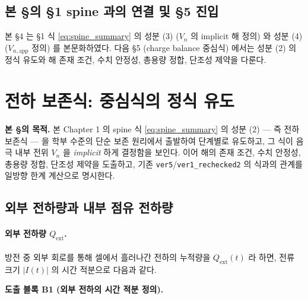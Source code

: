 \documentclass[11pt,a4paper]{article}
\newcommand{\app}{\mathrm{app}}
\newcommand{\ext}{\mathrm{ext}}
\begin{document}
\subsection{본 \S 의 \S 1 spine 과의 연결 및 \S 5 진입}
\label{sec:section_4_to_5_bridge}

본 \S 4 는 \S 1 식 \eqref{eq:spine_summary} 의 성분 (3) ($V_n$ 의 implicit 해 정의)
와 성분 (4) ($V_{n,\app}$ 정의) 를 본문화하였다. 다음 \S 5 (charge balance 중심식)
에서는 성분 (2) 의 정식 유도와 해 존재 조건, 수치 안정성, 총용량 정합, 단조성
제약을 다룬다.

\section{전하 보존식: 중심식의 정식 유도}
\label{sec:charge_balance}


\textbf{본 \S 의 목적.} 본 Chapter 1 의 spine 식 \eqref{eq:spine_summary} 의 성분
(2) — 즉 전하 보존식 — 을 학부 수준의 단순 보존 원리에서 출발하여 단계별로
유도하고, 그 식이 음극 내부 전위 $V_n$ 을 \emph{implicit} 하게 결정함을 보인다.
이어 해의 존재 조건, 수치 안정성, 총용량 정합, 단조성 제약을 도출하고, 기존
\texttt{ver5}/\texttt{ver1\_rechecked2} 의 식과의 관계를 일방향 한계 계산으로
명시한다.

\subsection{외부 전하량과 내부 점유 전하량}
\label{sec:internal_vs_external}

\paragraph{외부 전하량 $Q_{\ext}$.}

방전 중 외부 회로를 통해 셀에서 흘러나간 전하의 누적량을 $Q_{\ext}(t)$ 라 하면,
전류 크기 $|I(t)|$ 의 시간 적분으로 다음과 같다.

\textbf{도출 블록 B1 (외부 전하의 시간 적분 정의).}
\end{document}
